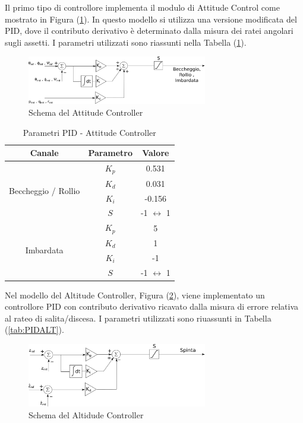 Il primo tipo di controllore implementa il modulo di Attitude Control come mostrato in Figura (\ref{fig:PIDAttitudeCTR}). In questo modello si utilizza una versione modificata del PID, dove il contributo derivativo è determinato dalla misura dei ratei angolari sugli assetti. I parametri utilizzati sono riassunti nella Tabella (\ref{tab:PIDATT}).

\begin{figure}
	\centering
	\includegraphics[width=0.7\textwidth]{SistemaQuadrirotore/Figure/PIDAttitudeCtrl}
	\caption{Schema del Attitude Controller}
	\label{fig:PIDAttitudeCTR}
\end{figure}


\begin{table}
	\centering
	\begin{tabular}{c c c}
		\hline
		Canale  & Parametro & Valore \\
		\hline
		\multirow{4}{*}{Beccheggio / Rollio}&$K_p$ & 0.531 \\
		&$K_d$ & 0.031\\
		&$K_i$ & -0.156\\
		&$S$ & -1 $\leftrightarrow$ 1\\
		\hline
		\multirow{4}{*}{Imbardata}&$K_p$ & 5 \\
		&$K_d$ & 1\\
		&$K_i$ & -1\\
		&$S$ & -1 $\leftrightarrow$ 1\\
		\hline
	\end{tabular}	
	\caption{Parametri PID - Attitude Controller}
	\label{tab:PIDATT}
\end{table}

Nel modello del Altitude Controller, Figura (\ref{fig:PIDAltitudeCTR}), viene implementato un controllore PID con contributo derivativo ricavato dalla misura di errore relativa al rateo di salita/discesa. I parametri utilizzati sono riuassunti in Tabella (\ref{tab:PIDALT}).

\begin{figure}
	\centering
	\includegraphics[width=0.7\textwidth]{SistemaQuadrirotore/Figure/PIDAltitudeCtrl}
	\caption{Schema del Altidude Controller}
	\label{fig:PIDAltitudeCTR}
\end{figure}

